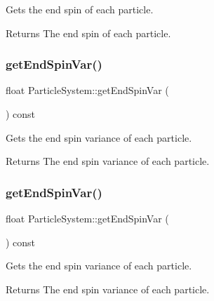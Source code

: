 Gets the end spin of each particle.

\begin{DoxyReturn}{Returns}
The end spin of each particle. 
\end{DoxyReturn}
\mbox{\label{classParticleSystem_a2ce1e5241e35f6b686cdbff0cc30fc2e}} 
\subsubsection{\texorpdfstring{get\+End\+Spin\+Var()}{getEndSpinVar()}\hspace{0.1cm}{\footnotesize\ttfamily [1/2]}}
{\footnotesize\ttfamily float Particle\+System\+::get\+End\+Spin\+Var (\begin{DoxyParamCaption}{ }\end{DoxyParamCaption}) const\hspace{0.3cm}{\ttfamily [inline]}}

Gets the end spin variance of each particle.

\begin{DoxyReturn}{Returns}
The end spin variance of each particle. 
\end{DoxyReturn}
\mbox{\label{classParticleSystem_a2ce1e5241e35f6b686cdbff0cc30fc2e}} 
\subsubsection{\texorpdfstring{get\+End\+Spin\+Var()}{getEndSpinVar()}\hspace{0.1cm}{\footnotesize\ttfamily [2/2]}}
{\footnotesize\ttfamily float Particle\+System\+::get\+End\+Spin\+Var (\begin{DoxyParamCaption}{ }\end{DoxyParamCaption}) const\hspace{0.3cm}{\ttfamily [inline]}}

Gets the end spin variance of each particle.

\begin{DoxyReturn}{Returns}
The end spin variance of each particle. 
\end{DoxyReturn}
\mbox{\label{classParticleSystem_a3c2fe41cd65f652cf7d81740c6f9faf1}} 
